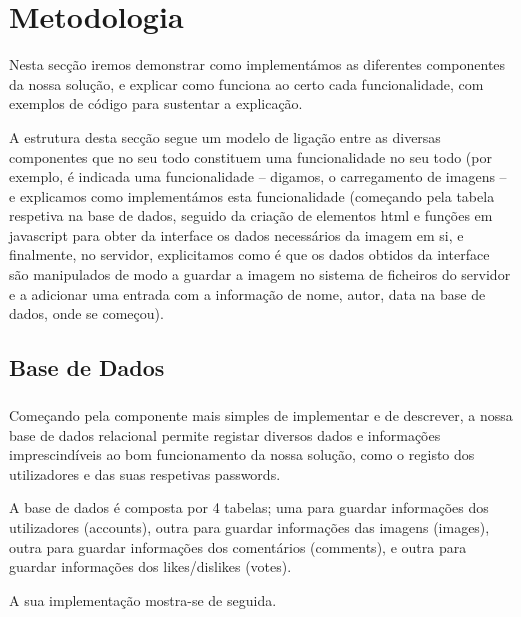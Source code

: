 \documentclass{report}
\begin{document}
\chapter{Metodologia}
\label{chap.metodologia}

Nesta secção iremos demonstrar como implementámos as diferentes componentes da nossa solução, e explicar como funciona ao certo cada funcionalidade, com exemplos de código para sustentar a explicação.

\linebreak
\bigskip

	A estrutura desta secção segue um modelo de ligação entre as diversas componentes que no seu todo constituem uma funcionalidade no seu todo (por exemplo, é indicada uma funcionalidade – digamos, o carregamento de imagens – e explicamos como implementámos esta funcionalidade (começando pela tabela respetiva na base de dados, seguido da criação de elementos html e funções em javascript para obter da interface os dados necessários da imagem em si, e finalmente, no servidor, explicitamos como é que os dados obtidos da interface são manipulados de modo a guardar a imagem no sistema de ficheiros do servidor e a adicionar uma entrada com a informação de nome, autor, data na base de dados, onde se começou).


\section{Base de Dados}

\paragraph{}
    Começando pela componente mais simples de implementar e de descrever, a nossa base de dados relacional permite registar diversos dados e informações imprescindíveis ao bom funcionamento da nossa solução, como o registo dos utilizadores e das suas respetivas passwords.

	A base de dados é composta por 4 tabelas; uma para guardar informações dos utilizadores (accounts), outra para guardar informações das imagens (images), outra para guardar informações dos comentários (comments), e outra para guardar informações dos likes/dislikes (votes).

 \newpage
    A sua implementação mostra-se de seguida.
\end{document}
